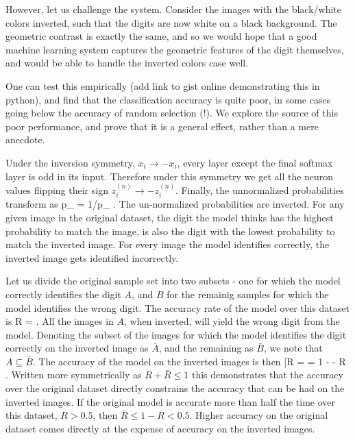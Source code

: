 \documentclass[twocolumn, prl]{revtex4-1}
\begin{document}
However, let us challenge the system. Consider the images with the black/white colors inverted, such that the digits are now white on 
a black background. The geometric contrast is exactly the same, and so we would hope that a good machine learning system captures the geometric features of the digit themselves, and would be able to handle the inverted colors case well.

One can test this empirically (add link to gist online demonstrating this in python), and find that the classification accuracy is quite poor, in some cases going below the accuracy of random selection (!). We explore the source of this poor performance, and prove that it is a general effect, rather than a mere anecdote.

Under the inversion symmetry, $x_i \rightarrow - x_i$, every layer except the final softmax layer is odd in its 
input. Therefore under this symmetry we get all the neuron values flipping their sign $z^{(n)}_i \rightarrow - z^{(n)}_i$. Finally, the unnormalized probabilities transform as
\be
{\tilde p}_{\alpha} \rightarrow \exp{} = 1/{\tilde p}_{\alpha}
\; .
\ee
The un-normalized probabilities are inverted. For any given image in the original dataset, the digit the model thinks has the highest probability to match the image, is also the digit with the lowest probability to match the inverted image. For every image the model identifies correctly, the inverted image
gets identified incorrectly.

Let us divide the original sample set into two subsets - one for which the model correctly identifies the digit $A$, and $B$ for the remainig samples for which the model identifies the wrong digit. The accuracy rate of the model over this dataset is 
\be
R = 
\; .
\ee
All the images in $A$, when inverted, will yield the wrong digit from the model. Denoting the subset of the images for which the model identifies the digit correctly on the inverted image as ${\bar A}$, and the remaining as ${\bar B}$, we note that $A \subseteq {\bar B}$. The accuracy of the model on the inverted images is then
\be
{\bar R} =  = 1 -   - R
\; .
\ee
Written more symmetrically as $R + {\bar R} \leq 1$ this demonstrates that the accuracy over the original dataset directly constrains the accuracy that can be had on the inverted images. If the original model is accurate more than half the time over this dataset, $R>0.5$, then ${\bar R} \leq 1 - R < 0.5$. Higher accuracy on the original dataset comes directly at the expense of accuracy on the inverted images. 
\end{document}
